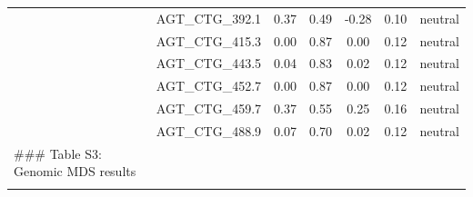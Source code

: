 \documentclass[11pt,]{article}
\begin{document}
\begin{longtable}[c]{@{}lcccccc@{}}
\\\addlinespace
& AGT\_CTG\_392.1 & 0.37 & 0.49 & -0.28 & 0.10 & neutral
\\\addlinespace
& AGT\_CTG\_415.3 & 0.00 & 0.87 & 0.00 & 0.12 & neutral
\\\addlinespace
& AGT\_CTG\_443.5 & 0.04 & 0.83 & 0.02 & 0.12 & neutral
\\\addlinespace
& AGT\_CTG\_452.7 & 0.00 & 0.87 & 0.00 & 0.12 & neutral
\\\addlinespace
& AGT\_CTG\_459.7 & 0.37 & 0.55 & 0.25 & 0.16 & neutral
\\\addlinespace
& AGT\_CTG\_488.9 & 0.07 & 0.70 & 0.02 & 0.12 & neutral
\\\addlinespace
\#\#\# Table S3: Genomic MDS results & & & & & &
\\\addlinespace
\bottomrule
\end{longtable}
\end{document}
